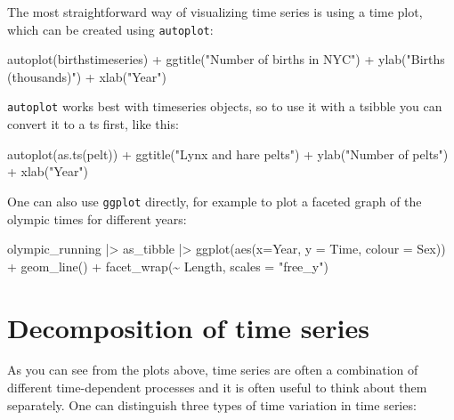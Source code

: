 \documentclass[
  letterpaper,
  DIV=11,
  numbers=noendperiod]{scrreprt}
\newenvironment{Shaded}{\begin{snugshade}}{\end{snugshade}}
\newcommand{\NormalTok}[1]{\textcolor[rgb]{0.00,0.23,0.31}{#1}}
\begin{document}
The most straightforward way of visualizing time series is using a time
plot, which can be created using \texttt{autoplot}:

\begin{Shaded}
\begin{Highlighting}[]
\NormalTok{autoplot(birthstimeseries) +}
\NormalTok{  ggtitle("Number of births in NYC") +}
\NormalTok{  ylab("Births (thousands)") +}
\NormalTok{  xlab("Year")}
\end{Highlighting}
\end{Shaded}

\texttt{autoplot} works best with timeseries objects, so to use it with
a tsibble you can convert it to a ts first, like this:

\begin{Shaded}
\begin{Highlighting}[]
\NormalTok{autoplot(as.ts(pelt)) +}
\NormalTok{  ggtitle("Lynx and hare pelts") +}
\NormalTok{  ylab("Number of pelts") +}
\NormalTok{  xlab("Year")}
\end{Highlighting}
\end{Shaded}

One can also use \texttt{ggplot} directly, for example to plot a faceted
graph of the olympic times for different years:

\begin{Shaded}
\begin{Highlighting}[]
\NormalTok{olympic\_running |\textgreater{} as\_tibble |\textgreater{}}
\NormalTok{  ggplot(aes(x=Year, y = Time, colour = Sex)) +}
\NormalTok{  geom\_line() +}
\NormalTok{  facet\_wrap(\textasciitilde{} Length, scales = "free\_y")}
\end{Highlighting}
\end{Shaded}

\section{Decomposition of time
series}\label{decomposition-of-time-series}

As you can see from the plots above, time series are often a combination
of different time-dependent processes and it is often useful to think
about them separately. One can distinguish three types of time variation
in time series:
\end{document}

